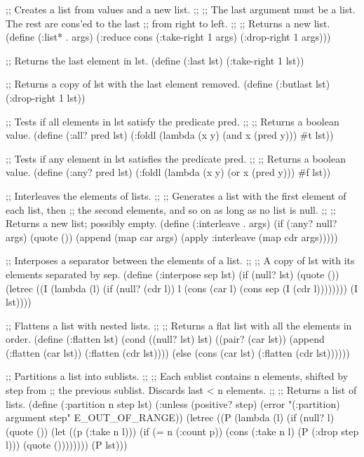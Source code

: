 ;; Creates a list from values and a new list.
;;
;; The last argument must be a list. The rest are cons'ed to the last
;; from right to left.
;;
;; Returns a new list.
(define (:list* . args)
  (:reduce cons (:take-right 1 args) (:drop-right 1 args)))


;; Returns the last element in lst.
(define (:last lst)
  (:take-right 1 lst))


;; Returns a copy of lst with the last element removed.
(define (:butlast lst)
  (:drop-right 1 lst))


;; Tests if all elements in lst satisfy the predicate pred.
;;
;; Returns a boolean value.
(define (:all? pred lst)
  (:foldl (lambda (x y) (and x (pred y))) #t lst))


;; Tests if any element in lst satisfies the predicate pred.
;;
;; Returns a boolean value.
(define (:any? pred lst)
  (:foldl (lambda (x y) (or x (pred y))) #f lst))


;; Interleaves the elements of lists.
;;
;; Generates a list with the first element of each list, then
;; the second elements, and so on as long as no list is null.
;;
;; Returns a new list; possibly empty.
(define (:interleave . args)
  (if (:any? null? args)
    (quote ())
    (append (map car args) (apply :interleave (map cdr args)))))


;; Interposes a separator between the elements of a list.
;;
;; A copy of lst with its elements separated by sep.
(define (:interpose sep lst)
  (if (null? lst)
    (quote ())
    (letrec ((I (lambda (l)
                  (if (null? (cdr l))
                    l
                    (cons (car l) (cons sep (I (cdr l))))))))
      (I lst))))


;; Flattens a list with nested lists.
;;
;; Returns a flat list with all the elements in order.
(define (:flatten lst)
  (cond ((null? lst) lst)
        ((pair? (car lst)) (append (:flatten (car lst)) (:flatten (cdr lst))))
        (else (cons (car lst) (:flatten (cdr lst))))))


;; Partitions a list into sublists.
;;
;; Each sublist contains n elements, shifted by step from
;; the previous sublist. Discards last < n elements.
;;
;; Returns a list of lists.
(define (:partition n step lst)
  (:unless (positive? step)
    (error "(:partition) argument step" E_OUT_OF_RANGE))
  (letrec ((P (lambda (l)
                (if (null? l)
                  (quote ())
                  (let ((p (:take n l)))
                    (if (= n (:count p))
                      (cons (:take n l) (P (:drop step l)))
                      (quote ())))))))
    (P lst)))


